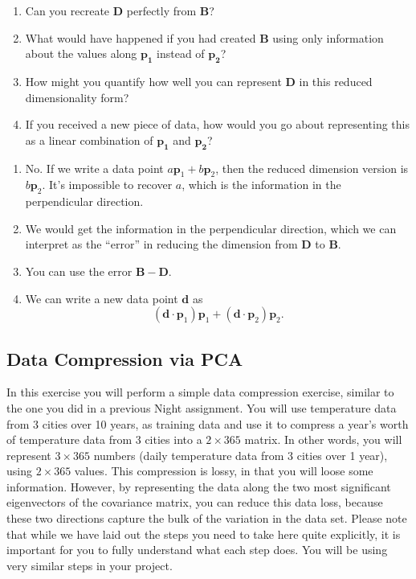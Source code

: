 \begin{prob}
\begin{enumerate}
\item Can you recreate $\mathbf{D}$ perfectly from $\mathbf{B}$?
\item What would have happened if you had created $\mathbf{B}$ using only information about the values along $\mathbf{p_1}$ instead of $\mathbf{p_{2}}$?
\item How might you quantify how well you can represent $\mathbf{D}$ in this reduced dimensionality form?
\item If you received a new piece of data, how would you go about representing this as a linear combination of $\mathbf{p_{1}}$ and $\mathbf{p_2}$?
\end{enumerate}
\end{prob}
\begin{sol}
\begin{enumerate}
    \item No. If we write a data point $a\mathbf{p}_1 + b\mathbf{p}_2$, then the reduced dimension version is $b\mathbf{p}_2$. It's impossible to recover $a$, which is the information in the perpendicular direction.
    \item We would get the information in the perpendicular direction, which we can interpret as the ``error'' in reducing the dimension from $\mathbf{D}$ to $\mathbf{B}$.
    \item You can use the error $\mathbf{B}-\mathbf{D}$.
    \item We can write a new data point $\mathbf{d}$ as
    $$(\mathbf{d}\cdot\mathbf{p}_1)\mathbf{p}_1 + (\mathbf{d}\cdot\mathbf{p}_2)\mathbf{p}_2.$$
    \end{enumerate}
\end{sol}

\subsection{Data Compression via PCA}

In this exercise you will perform a simple data compression exercise, similar to the one you did in a previous Night assignment. You will use temperature data from 3 cities over 10 years, as training data and use it to compress a year's worth of temperature data from 3 cities into a $2\times 365$ matrix. In other words, you will represent $3\times 365$ numbers (daily temperature data from 3 cities over 1 year), using $2\times 365$ values. This compression is lossy, in that you will loose some information. However, by representing the data along the two most significant eigenvectors of the covariance matrix, you can reduce this data loss, because these two directions capture the bulk of the variation in the data set. Please note that while we have laid out the steps you need to take here quite explicitly, it is important for you to fully understand what each step does. You will be using very similar steps in your project.

